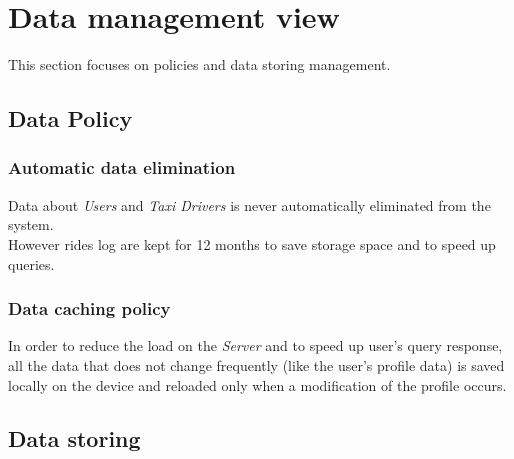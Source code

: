 \section{Data management view} %
\label{sec:data_management}
This section focuses on policies and data storing management.\\
\subsection{Data Policy} %
\label{sub:data_policy}
\subsubsection{Automatic data elimination} %
\label{ssub:data_elimination}
Data about \emph{Users} and \emph{Taxi Drivers} is never automatically eliminated from the system.\\
However rides log are kept for 12 months to save storage space and to speed up queries.
\subsubsection{Data caching policy} %
\label{ssub:data_caching}
In order to reduce the load on the \emph{Server} and to speed up user's query response, all the data that does not change frequently (like the user's profile data) is saved locally on the device and reloaded only when a modification of the profile occurs.

\subsection{Data storing} %
\label{sub:data_storing}

